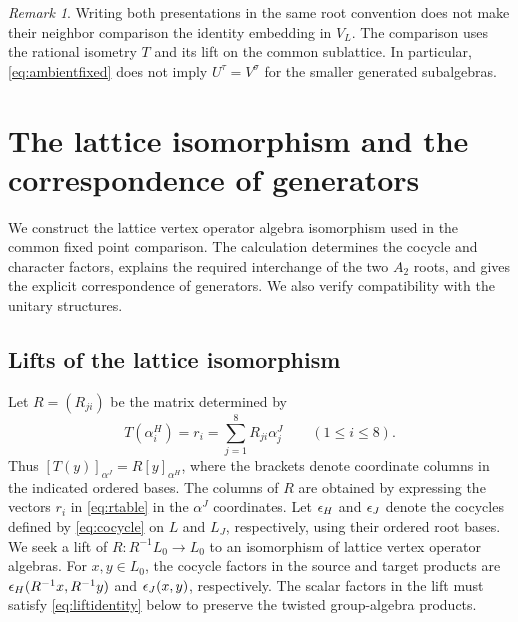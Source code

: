 \documentclass[11pt,reqno]{amsart}
\theoremstyle{definition}\newtheorem{definition}[theorem]{Definition}
\theoremstyle{remark}\newtheorem{remark}[theorem]{Remark}
\numberwithin{equation}{section}
\begin{document}
\begin{remark}
Writing both presentations in the same root convention does not make their neighbor comparison the identity embedding in $V_L$. The comparison uses the rational isometry $T$ and its lift on the common sublattice. In particular, \eqref{eq:ambientfixed} does not imply $U^\tau=V^\sigma$ for the smaller generated subalgebras.
\end{remark}

\section{The lattice isomorphism and the correspondence of generators}\label{sec:lift}
We construct the lattice vertex operator algebra isomorphism used in the common fixed point comparison. The calculation determines the cocycle and character factors, explains the required interchange of the two $A_2$ roots, and gives the explicit correspondence of generators. We also verify compatibility with the unitary structures.

\subsection{Lifts of the lattice isomorphism}
\leavevmode
\begingroup
Let $R=(R_{ji})$ be the matrix determined by
\[
 T(\alpha_i^H)=r_i=\sum_{j=1}^{8}R_{ji}\alpha_j^J
 \qquad(1\le i\le8).
\]
Thus $[T(y)]_{\alpha^J}=R[y]_{\alpha^H}$, where the brackets denote coordinate columns in the indicated ordered bases. The columns of $R$ are obtained by expressing the vectors $r_i$ in \eqref{eq:rtable} in the $\alpha^J$ coordinates. Let $\epsilon_H$ and $\epsilon_J$ denote the cocycles defined by \eqref{eq:cocycle} on $L$ and $L_J$, respectively, using their ordered root bases. We seek a lift of $R:R^{-1}L_0\longrightarrow L_0$ to an isomorphism of lattice vertex operator algebras. For $x,y\in L_0$, the cocycle factors in the source and target products are $\epsilon_H(R^{-1}x,R^{-1}y)$ and $\epsilon_J(x,y)$, respectively. The scalar factors in the lift must satisfy \eqref{eq:liftidentity} below to preserve the twisted group-algebra products.
\end{document}
